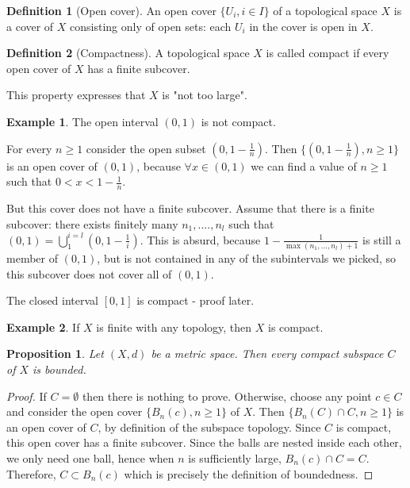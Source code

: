 \documentclass{article}
\theoremstyle{definition}
\newtheorem{defn}{Definition}[section]
\newtheorem{exmp}{Example}[section]
\theoremstyle{plain}%
\newtheorem{prop}[thm]{Proposition}
\theoremstyle{remark}
\newcommand{\Union}{\bigcup}
\newcommand{\intersection}{\cap}
\begin{document}
\begin{defn}[Open cover]
    An open cover $\{U_i, i \in I\}$ of a topological space $X$ is a cover of $X$ consisting only of open sets: each $U_i$ in the cover is open in $X$.
\end{defn}

\begin{defn}[Compactness]
    A topological space $X$ is called compact if every open cover of $X$ has a finite subcover.
\end{defn}

This property expresses that $X$ is "not too large".

\begin{exmp}
    The open interval $(0,1)$ is not compact.
    
    For every $n \ge 1$ consider the open subset $(0,1 - \frac{1}{n})$. Then $\{(0, 1- \frac{1}{n}), n \ge 1\}$ is an open cover of $(0,1)$, because $\forall x \in (0,1)$ we can find a value of $n \ge 1$ such that $0 < x < 1-\frac{1}{n}$.
    
    But this cover does not have a finite subcover. Assume that there is a finite subcover: there exists finitely many $n_1, ...., n_l$ such that $(0,1) = \Union_{1}^{i=l} (0, 1- \frac{1}{i})$. This is absurd, because $1 - \frac{1}{\max(n_1, ..., n_l) + 1}$ is still a member of $(0,1)$, but is not contained in any of the subintervals we picked, so this subcover does not cover all of $(0,1)$.
    
    The closed interval $[0,1]$ is compact - proof later.
\end{exmp}

\begin{exmp}
    If $X$ is finite with any topology, then $X$ is compact.
\end{exmp}

\begin{prop}
    Let $(X,d)$ be a metric space. Then every compact subspace $C$ of $X$ is bounded.
\end{prop}

\begin{proof}
    If $C = \emptyset$ then there is nothing to prove. Otherwise, choose any point $c \in C$ and consider the open cover $\{B_n(c), n \ge 1\}$ of $X$. Then $\{B_n(C) \intersection C, n \ge 1\}$ is an open cover of $C$, by definition of the subspace topology. Since $C$ is compact, this open cover has a finite subcover. Since the balls are nested inside each other, we only need one ball, hence when $n$ is sufficiently large, $B_n(c) \intersection C = C$. Therefore, $C \subset B_n(c)$ which is precisely the definition of boundedness. 
\end{proof}
\end{document}
